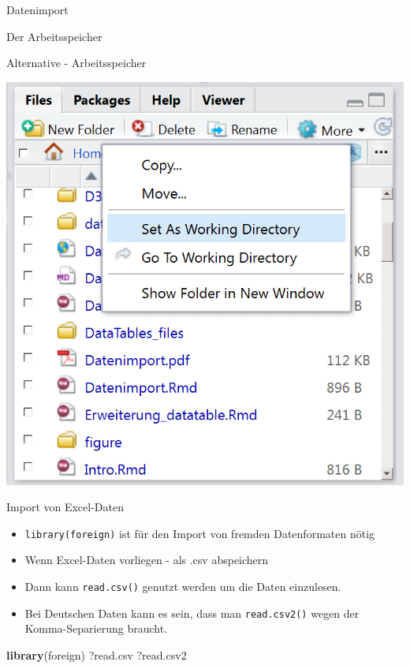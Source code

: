 \documentclass[ignorenonframetext,]{beamer}
\newenvironment{Shaded}{}{}
\newcommand{\KeywordTok}[1]{\textcolor[rgb]{0.00,0.44,0.13}{\textbf{{#1}}}}
\newcommand{\NormalTok}[1]{{#1}}
\providecommand{\tightlist}{%
\setlength{\itemsep}{0pt}\setlength{\parskip}{0pt}}
\begin{document}
\begin{frame}[fragile]{Datenimport}
\begin{block}{Der Arbeitsspeicher}
\end{block}

\begin{block}{Alternative - Arbeitsspeicher}

\includegraphics{./tex2pdf.9796/f4ebbc3c67143aca8b1f90ded80bc3bfc7e2d639.png}

\end{block}

\begin{block}{Import von Excel-Daten}

\begin{itemize}
\tightlist
\item
  \texttt{library(foreign)} ist für den Import von fremden Datenformaten
  nötig
\item
  Wenn Excel-Daten vorliegen - als .csv abspeichern
\item
  Dann kann \texttt{read.csv()} genutzt werden um die Daten einzulesen.
\item
  Bei Deutschen Daten kann es sein, dass man \texttt{read.csv2()} wegen
  der Komma-Separierung braucht.
\end{itemize}

\begin{Shaded}
\begin{Highlighting}[]
\KeywordTok{library}\NormalTok{(foreign)}
\NormalTok{?read.csv}
\NormalTok{?read.csv2}
\end{Highlighting}
\end{Shaded}


\end{block}
\end{frame}
\end{document}
